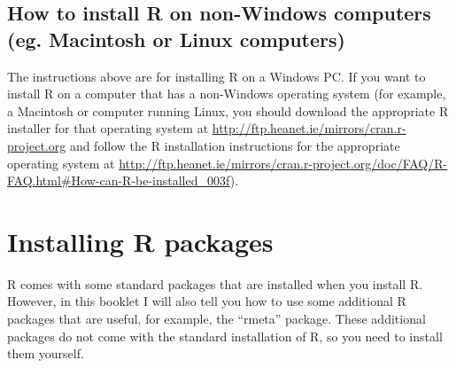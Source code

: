 \documentclass[a4paper,10pt,english]{sphinxmanual}
\begin{document}
\subsection{How to install R on non-Windows computers (eg. Macintosh or Linux computers)}
\label{src/installr:how-to-install-r-on-non-windows-computers-eg-macintosh-or-linux-computers}
The instructions above are for installing R on a Windows PC. If you want to install R
on a computer that has a non-Windows operating system (for example, a Macintosh or computer running Linux,
you should download the appropriate R installer for that operating system at
\href{http://ftp.heanet.ie/mirrors/cran.r-project.org/}{http://ftp.heanet.ie/mirrors/cran.r-project.org} and
follow the R installation instructions for the appropriate operating system at
\href{http://ftp.heanet.ie/mirrors/cran.r-project.org/doc/FAQ/R-FAQ.html\#How-can-R-be-installed\_003f}{http://ftp.heanet.ie/mirrors/cran.r-project.org/doc/FAQ/R-FAQ.html\#How-can-R-be-installed\_003f}).


\section{Installing R packages}
\label{src/installr:installing-r-packages}
R comes with some standard packages that are installed when you install R. However, in this
booklet I will also tell you how to use some additional R packages that are useful, for example,
the ``rmeta'' package. These additional packages do not come with the standard installation of R,
so you need to install them yourself.
\end{document}
